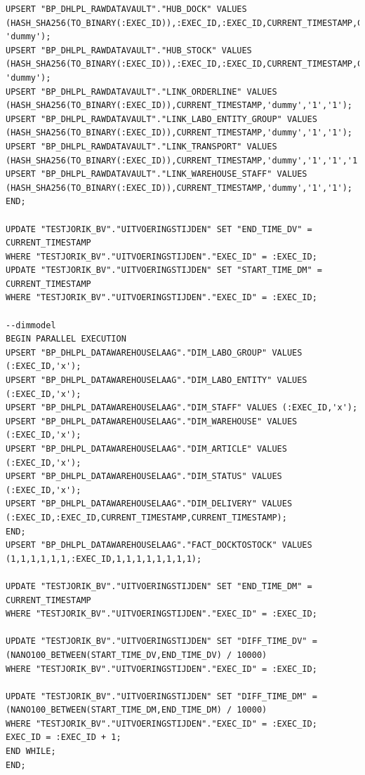 \begin{lstlisting}[frame=single]
UPSERT "BP_DHLPL_RAWDATAVAULT"."HUB_DOCK" VALUES (HASH_SHA256(TO_BINARY(:EXEC_ID)),:EXEC_ID,:EXEC_ID,CURRENT_TIMESTAMP,CURRENT_TIMESTAMP, 'dummy');
UPSERT "BP_DHLPL_RAWDATAVAULT"."HUB_STOCK" VALUES (HASH_SHA256(TO_BINARY(:EXEC_ID)),:EXEC_ID,:EXEC_ID,CURRENT_TIMESTAMP,CURRENT_TIMESTAMP, 'dummy');
UPSERT "BP_DHLPL_RAWDATAVAULT"."LINK_ORDERLINE" VALUES (HASH_SHA256(TO_BINARY(:EXEC_ID)),CURRENT_TIMESTAMP,'dummy','1','1');
UPSERT "BP_DHLPL_RAWDATAVAULT"."LINK_LABO_ENTITY_GROUP" VALUES (HASH_SHA256(TO_BINARY(:EXEC_ID)),CURRENT_TIMESTAMP,'dummy','1','1');
UPSERT "BP_DHLPL_RAWDATAVAULT"."LINK_TRANSPORT" VALUES (HASH_SHA256(TO_BINARY(:EXEC_ID)),CURRENT_TIMESTAMP,'dummy','1','1','1');
UPSERT "BP_DHLPL_RAWDATAVAULT"."LINK_WAREHOUSE_STAFF" VALUES (HASH_SHA256(TO_BINARY(:EXEC_ID)),CURRENT_TIMESTAMP,'dummy','1','1');
END;

UPDATE "TESTJORIK_BV"."UITVOERINGSTIJDEN" SET "END_TIME_DV" = CURRENT_TIMESTAMP
WHERE "TESTJORIK_BV"."UITVOERINGSTIJDEN"."EXEC_ID" = :EXEC_ID;
UPDATE "TESTJORIK_BV"."UITVOERINGSTIJDEN" SET "START_TIME_DM" = CURRENT_TIMESTAMP
WHERE "TESTJORIK_BV"."UITVOERINGSTIJDEN"."EXEC_ID" = :EXEC_ID;

--dimmodel
BEGIN PARALLEL EXECUTION
UPSERT "BP_DHLPL_DATAWAREHOUSELAAG"."DIM_LABO_GROUP" VALUES (:EXEC_ID,'x');
UPSERT "BP_DHLPL_DATAWAREHOUSELAAG"."DIM_LABO_ENTITY" VALUES (:EXEC_ID,'x');
UPSERT "BP_DHLPL_DATAWAREHOUSELAAG"."DIM_STAFF" VALUES (:EXEC_ID,'x');
UPSERT "BP_DHLPL_DATAWAREHOUSELAAG"."DIM_WAREHOUSE" VALUES (:EXEC_ID,'x');
UPSERT "BP_DHLPL_DATAWAREHOUSELAAG"."DIM_ARTICLE" VALUES (:EXEC_ID,'x');
UPSERT "BP_DHLPL_DATAWAREHOUSELAAG"."DIM_STATUS" VALUES (:EXEC_ID,'x');
UPSERT "BP_DHLPL_DATAWAREHOUSELAAG"."DIM_DELIVERY" VALUES (:EXEC_ID,:EXEC_ID,CURRENT_TIMESTAMP,CURRENT_TIMESTAMP);
END;
UPSERT "BP_DHLPL_DATAWAREHOUSELAAG"."FACT_DOCKTOSTOCK" VALUES (1,1,1,1,1,1,:EXEC_ID,1,1,1,1,1,1,1,1);

UPDATE "TESTJORIK_BV"."UITVOERINGSTIJDEN" SET "END_TIME_DM" = CURRENT_TIMESTAMP
WHERE "TESTJORIK_BV"."UITVOERINGSTIJDEN"."EXEC_ID" = :EXEC_ID;

UPDATE "TESTJORIK_BV"."UITVOERINGSTIJDEN" SET "DIFF_TIME_DV" = (NANO100_BETWEEN(START_TIME_DV,END_TIME_DV) / 10000)
WHERE "TESTJORIK_BV"."UITVOERINGSTIJDEN"."EXEC_ID" = :EXEC_ID;

UPDATE "TESTJORIK_BV"."UITVOERINGSTIJDEN" SET "DIFF_TIME_DM" = (NANO100_BETWEEN(START_TIME_DM,END_TIME_DM) / 10000)
WHERE "TESTJORIK_BV"."UITVOERINGSTIJDEN"."EXEC_ID" = :EXEC_ID;
EXEC_ID = :EXEC_ID + 1;
END WHILE;
END;
\end{lstlisting}

